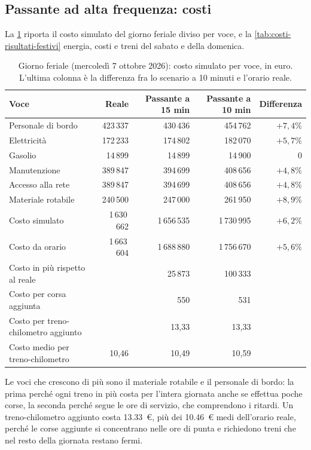 \subsection{Passante ad alta frequenza: costi}
La \cref{tab:costi-risultati} riporta il costo simulato del giorno feriale diviso per voce, e la \cref{tab:costi-risultati-festivi} energia, costi e treni del sabato e della domenica.

\begin{table}[H]
	\centering
	\caption{Giorno feriale (mercoledì 7 ottobre 2026): costo simulato per voce, in euro. L'ultima colonna è la differenza fra lo scenario a 10 minuti e l'orario reale.}
	\label{tab:costi-risultati}
	\begin{tabularx}{\textwidth}{Xrrrr}
		\toprule
		Voce & Reale & Passante a 15 min & Passante a 10 min & Differenza \\
		\midrule
		Personale di bordo & 423\,337 & 430\,436 & 454\,762 & $+7{,}4\%$ \\
		Elettricità & 172\,233 & 174\,802 & 182\,070 & $+5{,}7\%$ \\
		Gasolio & 14\,899 & 14\,899 & 14\,900 & 0 \\
		Manutenzione & 389\,847 & 394\,699 & 408\,656 & $+4{,}8\%$ \\
		Accesso alla rete & 389\,847 & 394\,699 & 408\,656 & $+4{,}8\%$ \\
		Materiale rotabile & 240\,500 & 247\,000 & 261\,950 & $+8{,}9\%$ \\
		\midrule
		Costo simulato & 1\,630\,662 & 1\,656\,535 & 1\,730\,995 & $+6{,}2\%$ \\
		Costo da orario & 1\,663\,604 & 1\,688\,880 & 1\,756\,670 & $+5{,}6\%$ \\
		\midrule
		Costo in più rispetto al reale & & 25\,873 & 100\,333 & \\
		Costo per corsa aggiunta & & 550 & 531 & \\
		Costo per treno-chilometro aggiunto & & 13,33 & 13,33 & \\
		Costo medio per treno-chilometro & 10,46 & 10,49 & 10,59 & \\
		\bottomrule
	\end{tabularx}
\end{table}

Le voci che crescono di più sono il materiale rotabile e il personale di bordo: la prima perché ogni treno in più costa per l'intera giornata anche se effettua poche corse, la seconda perché segue le ore di servizio, che comprendono i ritardi. Un treno-chilometro aggiunto costa \SI{13,33}{\euro}, più dei \SI{10,46}{\euro} medi dell'orario reale, perché le corse aggiunte si concentrano nelle ore di punta e richiedono treni che nel resto della giornata restano fermi.

